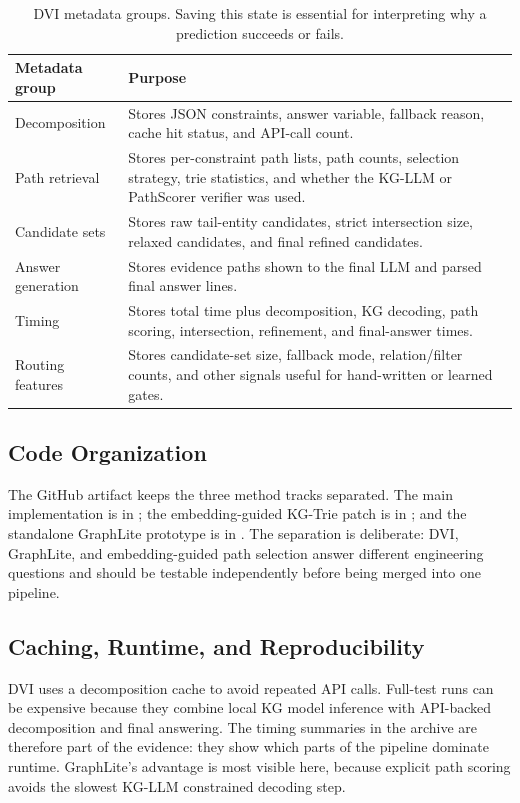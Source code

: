\documentclass[10pt,twocolumn]{article}
\begin{document}
\begin{table}[t]
\centering
\small
\begin{tabular}{p{}p{}}
\toprule
Metadata group & Purpose \\
\midrule
Decomposition & Stores JSON constraints, answer variable, fallback reason, cache hit status, and API-call count. \\
Path retrieval & Stores per-constraint path lists, path counts, selection strategy, trie statistics, and whether the KG-LLM or PathScorer verifier was used. \\
Candidate sets & Stores raw tail-entity candidates, strict intersection size, relaxed candidates, and final refined candidates. \\
Answer generation & Stores evidence paths shown to the final LLM and parsed final answer lines. \\
Timing & Stores total time plus decomposition, KG decoding, path scoring, intersection, refinement, and final-answer times. \\
Routing features & Stores candidate-set size, fallback mode, relation/filter counts, and other signals useful for hand-written or learned gates. \\
\bottomrule
\end{tabular}
\caption{DVI metadata groups. Saving this state is essential for interpreting why a prediction succeeds or fails.}
\label{tab:metadata-schema}
\end{table}

\subsection{Code Organization}
The GitHub artifact keeps the three method tracks separated. The main implementation is in ; the embedding-guided KG-Trie patch is in ; and the standalone GraphLite prototype is in . The separation is deliberate: DVI, GraphLite, and embedding-guided path selection answer different engineering questions and should be testable independently before being merged into one pipeline.

\subsection{Caching, Runtime, and Reproducibility}
DVI uses a decomposition cache to avoid repeated API calls. Full-test runs can be expensive because they combine local KG model inference with API-backed decomposition and final answering. The timing summaries in the archive are therefore part of the evidence: they show which parts of the pipeline dominate runtime. GraphLite's advantage is most visible here, because explicit path scoring avoids the slowest KG-LLM constrained decoding step.
\end{document}
